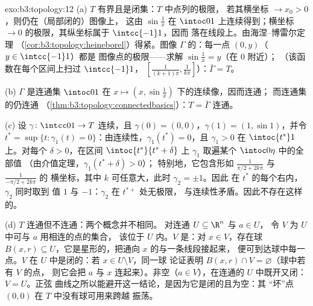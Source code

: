 \begin{solution}{exo:b3:topology:12}
(a) $T$ 有界且是闭集：$T$ 中点列的极限，
若其横坐标 $\to x_0 > 0$，则仍在（局部闭的）图像上，
这由 $\sin\frac1x$ 在 $\intoc01$ 上连续得到；横坐标
$\to 0$ 的极限，其纵坐标属于 $\intcc{-1}1$，因而
落在线段上。由海涅–博雷尔定理
（\cref{cor:b3:topology:heineborel}）得紧。图像
$\Gamma$ 的：每一点 $(0, y)$（$y \in \intcc{-1}1$）都是
图像点的极限——求解 $\sin\frac1x = y$（在 $0$ 附近）；
（该函数在每个区间上扫过 $\intcc{-1}1$，
$[\frac1{(k+1)\pi}, \frac1{k\pi}]$）：$\bar\Gamma = T$。

(b) $\Gamma$ 是连通集
$\intoc01$ 在 $x \mapsto (x, \sin\frac1x)$ 下的连续像，因而连通；
而连通集的仍连通
（\cref{thm:b3:topology:connectedbasics}）：$T = \bar\Gamma$
连通。

(c) 设 $\gamma\colon\intcc01\to T$ 连续，且
$\gamma(0) = (0,0)$，$\gamma(1) = (1, \sin1)$，并令 $t^*
= \sup\{t : \gamma_1(t) = 0\}$：由连续性，$\gamma_1(t^*)
= 0$，且 $\gamma_1 > 0$ 在 $\intoc{t^*}1$ 上。对每个
$\delta > 0$，在区间 $\intoc{t^*}{t^*+\delta}$ 上
$\gamma_1$ 取遍某个 $\intoc0\eta$ 中的全部值
（由介值定理，$\gamma_1(t^* + \delta) > 0$）；
特别地，它包含形如
$\frac1{\pi/2 + 2k\pi}$ 与 $\frac1{-\pi/2 + 2k\pi}$ 的
横坐标，其中 $k$ 可任意大，此时 $\gamma_2 = \pm1$。因此
在 $t^*$ 的每个右内，$\gamma_2$ 同时取到
值 $1$ 与 $-1$：$\gamma_2$ 在 $t^{*+}$ 处无极限，
与连续性矛盾。因此不存在这样的。

(d) $T$ 连通但不连通：两个概念并不相同。
对连通 $U \subseteq \R^n$ 与 $a \in U$，
令 $V$ 为 $U$ 中可与 $a$ 用相连的点的集合，
该位于 $U$ 内。$V$ 是：对 $x \in V$，存在球 $B(x, r)
\subseteq U$，它是星形的，把通向 $x$ 的与一条线段接起来，
便可到达球中每一点。$V$ 在
$U$ 中是闭的：若 $x \in U \setminus V$，同一球
论证表明 $B(x, r) \cap V = \varnothing$（球中若有 $V$ 的点，
则它会把 $a$ 与 $x$ 连起来）。非空（$a \in
V$），在连通的 $U$ 中既开又闭：$V = U$。正弦
曲线之所以能避开这一结论，是因为它是闭的且为空：其
“坏”点 $(0,0)$ 在 $T$ 中没有球可用来跨越
振荡。
\end{solution}

